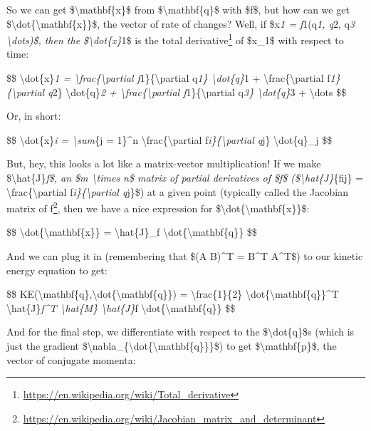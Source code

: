 \documentclass[]{article}
\renewcommand{\href}[2]{#2\footnote{\url{#1}}}
\begin{document}
So we can get \$\textbackslash{}mathbf\{x\}\$ from
\$\textbackslash{}mathbf\{q\}\$ with \$f\$, but how can we get
\$\textbackslash{}dot\{\textbackslash{}mathbf\{x\}\}\$, the vector of rate of
changes? Well, if \$x\emph{1 = f}1(q\emph{1, q}2, q\emph{3
\textbackslash{}dots)\$, then the \$\textbackslash{}dot\{x\}}1\$ is the
\href{https://en.wikipedia.org/wiki/Total_derivative}{total derivative} of
\$x\_1\$ with respect to time:

\$\$ \textbackslash{}dot\{x\}\emph{1 =
\textbackslash{}frac\{\textbackslash{}partial f}1\}\{\textbackslash{}partial
q\emph{1\} \textbackslash{}dot\{q\}}1 +
\textbackslash{}frac\{\textbackslash{}partial
f\emph{1\}\{\textbackslash{}partial q}2\} \textbackslash{}dot\{q\}\emph{2 +
\textbackslash{}frac\{\textbackslash{}partial f}1\}\{\textbackslash{}partial
q\emph{3\} \textbackslash{}dot\{q\}}3 + \textbackslash{}dots \$\$

Or, in short:

\$\$ \textbackslash{}dot\{x\}\emph{i = \textbackslash{}sum}\{j = 1\}\^{}n
\textbackslash{}frac\{\textbackslash{}partial
f\emph{i\}\{\textbackslash{}partial q}j\} \textbackslash{}dot\{q\}\_j \$\$

But, hey, this looks a lot like a matrix-vector multiplication! If we make
\$\textbackslash{}hat\{J\}\emph{f\$, an \$m \textbackslash{}times n\$ matrix of
partial derivatives of \$f\$ (\$\textbackslash{}hat\{J\}}\{fij\} =
\textbackslash{}frac\{\textbackslash{}partial
f\emph{i\}\{\textbackslash{}partial q}j\}\$) at a given point (typically called
the
\href{https://en.wikipedia.org/wiki/Jacobian_matrix_and_determinant}{Jacobian
matrix of f}, then we have a nice expression for
\$\textbackslash{}dot\{\textbackslash{}mathbf\{x\}\}\$:

\$\$ \textbackslash{}dot\{\textbackslash{}mathbf\{x\}\} =
\textbackslash{}hat\{J\}\_f \textbackslash{}dot\{\textbackslash{}mathbf\{q\}\}
\$\$

And we can plug it in (remembering that \$(A B)\^{}T = B\^{}T A\^{}T\$) to our
kinetic energy equation to get:

\$\$
KE(\textbackslash{}mathbf\{q\},\textbackslash{}dot\{\textbackslash{}mathbf\{q\}\})
= \textbackslash{}frac\{1\}\{2\}
\textbackslash{}dot\{\textbackslash{}mathbf\{q\}\}\^{}T
\textbackslash{}hat\{J\}\emph{f\^{}T \textbackslash{}hat\{M\}
\textbackslash{}hat\{J\}}f \textbackslash{}dot\{\textbackslash{}mathbf\{q\}\}
\$\$

And for the final step, we differentiate with respect to the
\$\textbackslash{}dot\{q\}\$s (which is just the gradient
\$\textbackslash{}nabla\_\{\textbackslash{}dot\{\textbackslash{}mathbf\{q\}\}\}\$)
to get \$\textbackslash{}mathbf\{p\}\$, the vector of conjugate momenta:
\end{document}
